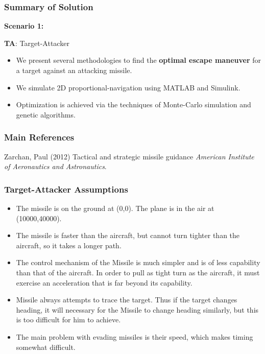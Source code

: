 \documentclass{beamer}
\begin{document}
\begin{frame}
\frametitle{Summary of Solution}
\textbf{Scenario 1:}
\begin{block}{\textbf{TA}: Target-Attacker}
	\begin{itemize}
		\item We present several methodologies to find the \textbf{optimal escape maneuver} for a target against an attacking missile. 
		\item We simulate 2D proportional-navigation using MATLAB and Simulink.
		\item Optimization is achieved via the techniques of Monte-Carlo simulation and genetic algorithms.
	\end{itemize}
\end{block}
\end{frame}
\begin{frame}
\frametitle{Main References}
\footnotesize{
	\begin{thebibliography}{99} %
		 Zarchan, Paul (2012)
		\newblock Tactical and strategic missile guidance
		\newblock \emph{American Institute of Aeronautics and Astronautics}.
	\end{thebibliography}
}
\end{frame}

\begin{frame}
\frametitle{Target-Attacker Assumptions}

\begin{itemize}
	\item The missile is on the ground at (0,0). The plane is in the air at (10000,40000).
	\item The missile is faster than the aircraft, but cannot turn tighter than the aircraft, so it takes a longer path.
	\item The control mechanism of the Missile is much simpler and is of less capability than that of the aircraft. In order to pull as tight turn as the aircraft, it must exercise an acceleration that is far beyond its capability.
	\item Missile always attempts to trace the target. Thus if the target changes heading, it will necessary for the Missile to change heading similarly, but this is too difficult for him to achieve.
	\item  The main problem with evading missiles is their speed, which makes timing somewhat difficult.
\end{itemize}
\end{frame}
\end{document}

